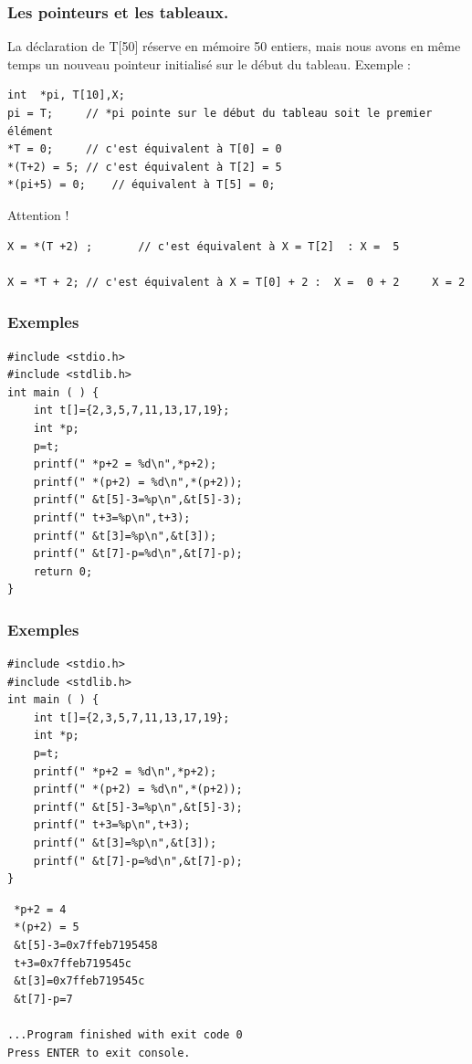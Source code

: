 \documentclass{beamer}
\begin{document}
\begin{frame}[fragile]
\frametitle{Les pointeurs et les tableaux.}
La déclaration de T[50]  réserve en mémoire 50 entiers, mais nous avons en même temps un nouveau pointeur initialisé sur le début du tableau.
Exemple :
\begin{verbatim}
int  *pi, T[10],X;
pi = T;		// *pi pointe sur le début du tableau soit le premier élément
*T = 0;		// c'est équivalent à T[0] = 0
*(T+2) = 5;	// c'est équivalent à T[2] = 5      
*(pi+5) = 0;	// équivalent à T[5] = 0;

\end{verbatim}
Attention !
\begin{verbatim}
X = *(T +2) ;   	// c'est équivalent à X = T[2]  : X =  5  
   
X = *T + 2;	// c'est équivalent à X = T[0] + 2 :  X =  0 + 2     X = 2
\end{verbatim}

\end{frame}

\begin{frame}[fragile]
\frametitle{Exemples}

\begin{verbatim}
#include <stdio.h>
#include <stdlib.h>
int main ( ) {
	int t[]={2,3,5,7,11,13,17,19};
	int *p;
	p=t;
	printf(" *p+2 = %d\n",*p+2); 
	printf(" *(p+2) = %d\n",*(p+2)); 
	printf(" &t[5]-3=%p\n",&t[5]-3); 
	printf(" t+3=%p\n",t+3); 
	printf(" &t[3]=%p\n",&t[3]); 
	printf(" &t[7]-p=%d\n",&t[7]-p); 
	return 0;
}
\end{verbatim}

\end{frame}

\begin{frame}[fragile]
\frametitle{Exemples}

\begin{verbatim}
#include <stdio.h>
#include <stdlib.h>
int main ( ) {
	int t[]={2,3,5,7,11,13,17,19};
	int *p;
	p=t;
	printf(" *p+2 = %d\n",*p+2); 
	printf(" *(p+2) = %d\n",*(p+2)); 
	printf(" &t[5]-3=%p\n",&t[5]-3); 
	printf(" t+3=%p\n",t+3); 
	printf(" &t[3]=%p\n",&t[3]); 
	printf(" &t[7]-p=%d\n",&t[7]-p); 
}
\end{verbatim}
{\tiny
\begin{verbatim}
 *p+2 = 4
 *(p+2) = 5
 &t[5]-3=0x7ffeb7195458
 t+3=0x7ffeb719545c
 &t[3]=0x7ffeb719545c
 &t[7]-p=7

...Program finished with exit code 0
Press ENTER to exit console.
\end{verbatim}
}
\end{frame}
\end{document}
